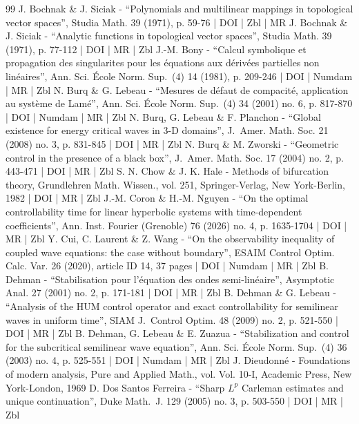 \begin{thebibliography}{99}
J. Bochnak \& J. Siciak - “Polynomials and multilinear mappings in topological vector spaces”, Studia Math. 39 (1971), p. 59-76 | DOI | Zbl | MR
J. Bochnak \& J. Siciak - “Analytic functions in topological vector spaces”, Studia Math. 39 (1971), p. 77-112 | DOI | MR | Zbl
J.-M. Bony - “Calcul symbolique et propagation des singularites pour les équations aux dérivées partielles non linéaires”, Ann. Sci. École Norm. Sup. (4) 14 (1981), p. 209-246 | DOI | Numdam | MR | Zbl
N. Burq \& G. Lebeau - “Mesures de défaut de compacité, application au système de Lamé”, Ann. Sci. École Norm. Sup. (4) 34 (2001) no. 6, p. 817-870 | DOI | Numdam | MR | Zbl
N. Burq, G. Lebeau \& F. Planchon - “Global existence for energy critical waves in 3-D domains”, J. Amer. Math. Soc. 21 (2008) no. 3, p. 831-845 | DOI | MR | Zbl
N. Burq \& M. Zworski - “Geometric control in the presence of a black box”, J. Amer. Math. Soc. 17 (2004) no. 2, p. 443-471 | DOI | MR | Zbl
S. N. Chow \& J. K. Hale - Methods of bifurcation theory, Grundlehren Math. Wissen., vol. 251, Springer-Verlag, New York-Berlin, 1982 | DOI | MR | Zbl
J.-M. Coron \& H.-M. Nguyen - “On the optimal controllability time for linear hyperbolic systems with time-dependent coefficients”, Ann. Inst. Fourier (Grenoble) 76 (2026) no. 4, p. 1635-1704 | DOI | MR | Zbl
Y. Cui, C. Laurent \& Z. Wang - “On the observability inequality of coupled wave equations: the case without boundary”, ESAIM Control Optim. Calc. Var. 26 (2020), article ID 14, 37 pages | DOI | Numdam | MR | Zbl
B. Dehman - “Stabilisation pour l’équation des ondes semi-linéaire”, Asymptotic Anal. 27 (2001) no. 2, p. 171-181 | DOI | MR | Zbl
B. Dehman \& G. Lebeau - “Analysis of the HUM control operator and exact controllability for semilinear waves in uniform time”, SIAM J. Control Optim. 48 (2009) no. 2, p. 521-550 | DOI | MR | Zbl
B. Dehman, G. Lebeau \& E. Zuazua - “Stabilization and control for the subcritical semilinear wave equation”, Ann. Sci. École Norm. Sup. (4) 36 (2003) no. 4, p. 525-551 | DOI | Numdam | MR | Zbl
J. Dieudonné - Foundations of modern analysis, Pure and Applied Math., vol. Vol. 10-I, Academic Press, New York-London, 1969
D. Dos Santos Ferreira - “Sharp $L^p$ Carleman estimates and unique continuation”, Duke Math. J. 129 (2005) no. 3, p. 503-550 | DOI | MR | Zbl

\end{thebibliography}
